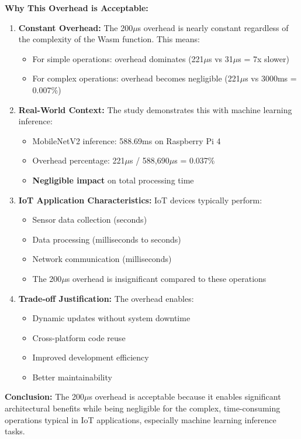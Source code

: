\documentclass[11pt]{article}
\begin{document}
\textbf{Why This Overhead is Acceptable:}

\begin{enumerate}[label=\arabic*.]
\item \textbf{Constant Overhead:} The 200$\mu$s overhead is nearly constant regardless of the complexity of the Wasm function. This means:
\begin{itemize}
\item For simple operations: overhead dominates (221$\mu$s vs 31$\mu$s = 7x slower)
\item For complex operations: overhead becomes negligible (221$\mu$s vs 3000ms = 0.007\%)
\end{itemize}

\item \textbf{Real-World Context:} The study demonstrates this with machine learning inference:
\begin{itemize}
\item MobileNetV2 inference: 588.69ms on Raspberry Pi 4
\item Overhead percentage: 221$\mu$s / 588,690$\mu$s = 0.037\%
\item \textbf{Negligible impact} on total processing time
\end{itemize}

\item \textbf{IoT Application Characteristics:} IoT devices typically perform:
\begin{itemize}
\item Sensor data collection (seconds)
\item Data processing (milliseconds to seconds)
\item Network communication (milliseconds)
\item The 200$\mu$s overhead is insignificant compared to these operations
\end{itemize}

\item \textbf{Trade-off Justification:} The overhead enables:
\begin{itemize}
\item Dynamic updates without system downtime
\item Cross-platform code reuse
\item Improved development efficiency
\item Better maintainability
\end{itemize}
\end{enumerate}

\textbf{Conclusion:} The 200$\mu$s overhead is acceptable because it enables significant architectural benefits while being negligible for the complex, time-consuming operations typical in IoT applications, especially machine learning inference tasks.
\end{document}

